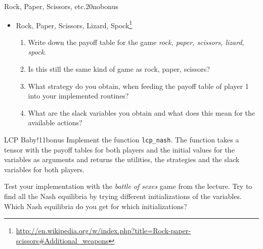 \documentclass[twoside,english,colorbacktitle,accentcolor=tud9c,10pt]{tudexercise}
\begin{document}
\begin{questions}
\begin{question}{Rock, Paper, Scissors, etc.}{20}{nobonus}
\begin{itemize}
\begin{enumerate}
			\item What are the slack variables you obtain and what does this mean for the available actions?
		\end{enumerate}
		\item Rock, Paper, Scissors, Lizard, Spock\footnote{\url{http://en.wikipedia.org/w/index.php?title=Rock-paper-scissors\#Additional\_weapons}}
		\begin{enumerate}
			\item Write down the payoff table for the game \emph{rock, paper, scissors, lizard, spock}.
			\item Is this still the same kind of game as rock, paper, scissors?
			\item What strategy do you obtain, when feeding the payoff table of player 1 into your implemented routines?
			\item What are the slack variables you obtain and what does this mean for the available actions?
		\end{enumerate}
	\end{itemize}
\end{question}

\begin{question}{LCP Baby!}{11}{bonus}
	Implement the function \texttt{lcp\_nash}.
	The function takes a tensor with the payoff tables for both players and the initial values for the variables as arguments and returns the utilities, the strategies and the slack variables for both players.

	Test your implementation with the \emph{battle of sexes} game from the lecture.
	Try to find all the Nash equilibria by trying different initializations of the variables.
	Which Nash equilibria do you get for which initializations?
\end{question}

\end{questions}

\end{document}

